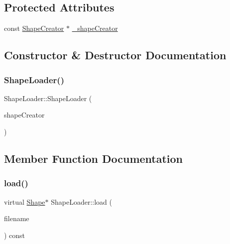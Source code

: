 \subsection*{Protected Attributes}
\begin{DoxyCompactItemize}
\item 
const \hyperlink{class_shape_creator}{Shape\+Creator} $\ast$ \hyperlink{class_shape_loader_ae412cdea4d16545ea9845870ec1e83e5}{\+\_\+shape\+Creator}
\end{DoxyCompactItemize}


\subsection{Constructor \& Destructor Documentation}
\hypertarget{class_shape_loader_a648a5e0abfda168281769ae2c68e1d0b}{}\label{class_shape_loader_a648a5e0abfda168281769ae2c68e1d0b} 
\subsubsection{\texorpdfstring{Shape\+Loader()}{ShapeLoader()}}
{\footnotesize\ttfamily Shape\+Loader\+::\+Shape\+Loader (\begin{DoxyParamCaption}\item[{const \hyperlink{class_shape_creator}{Shape\+Creator} $\ast$}]{shape\+Creator }\end{DoxyParamCaption})\hspace{0.3cm}{\ttfamily [inline]}}



\subsection{Member Function Documentation}
\hypertarget{class_shape_loader_af675cfe98578da47d31c54a3ea3748e1}{}\label{class_shape_loader_af675cfe98578da47d31c54a3ea3748e1} 
\subsubsection{\texorpdfstring{load()}{load()}}
{\footnotesize\ttfamily virtual \hyperlink{class_shape}{Shape}$\ast$ Shape\+Loader\+::load (\begin{DoxyParamCaption}\item[{const string \&}]{filename }\end{DoxyParamCaption}) const\hspace{0.3cm}{\ttfamily [pure virtual]}}



